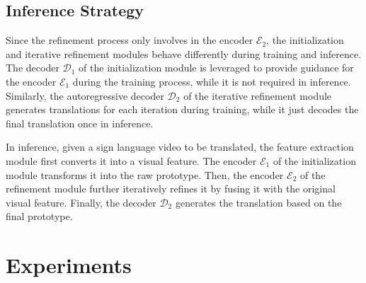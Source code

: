 \documentclass[10pt,twocolumn,letterpaper]{article}
\begin{document}
    \subsection{Inference Strategy}
    Since the refinement process only involves in the encoder $\mathcal{E}_2$, the initialization and iterative refinement modules behave differently during training and inference. The decoder $\mathcal{D}_1$ of the initialization module is leveraged to provide guidance for the encoder $\mathcal{E}_1$ during the training process, while it is not required in inference. Similarly, the autoregressive decoder $\mathcal{D}_2$ of the iterative refinement module generates translations for each iteration during training, while it just decodes the final translation once in inference.

    In inference, given a sign language video to be translated, the feature extraction module first converts it into a visual feature. The encoder $\mathcal{E}_1$ of the initialization module transforms it into the raw prototype. Then, the encoder $\mathcal{E}_2$ of the refinement module further iteratively refines it by fusing it with the original visual feature. Finally, the decoder $\mathcal{D}_2$ generates the translation based on the final prototype.
    

\section{Experiments}
\end{document}
